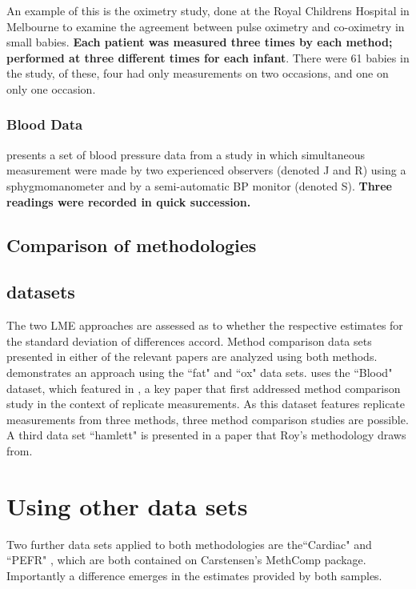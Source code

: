 \documentclass[12pt, a4paper]{report}
\theoremstyle{plain}
\theoremstyle{definition}
\theoremstyle{remark}
\begin{document}
An example of this is the oximetry study, done at the Royal
Childrens Hospital in Melbourne to examine the agreement between
pulse oximetry and co-oximetry in small babies.\textbf{ Each
patient was measured three times by each method; performed at
three different times for each infant}. There were 61 babies in
the study, of these, four had only measurements on two occasions,
and one on only one occasion.

\subsubsection{Blood Data}
\citet{BA99} presents a set of blood pressure data from a study in
which simultaneous measurement were made by two experienced
observers (denoted J and R) using a sphygmomanometer and by a
semi-automatic BP monitor (denoted S). \textbf{Three readings were
recorded in quick succession.}


\subsection{Comparison of methodologies}

\subsection{datasets}

The two LME approaches are assessed as to whether the respective estimates for the standard deviation of differences accord. Method comparison data sets presented in either of the relevant papers are analyzed using both methods.
\citet{bxc2008} demonstrates an approach using the ``fat" and ``ox" data sets. \citet{roy} uses the ``Blood" dataset, which featured in \citet{BA99} , a key paper that first addressed method comparison study in the context of replicate measurements. As this dataset features replicate measurements from three methods, three method comparison studies are possible. A third data set ``hamlett" is presented in \citet{Hamlett} a paper that Roy's methodology draws from.


\section{Using other data sets}

Two further data sets applied to both methodologies are the``Cardiac" and ``PEFR" , which are both contained on Carstensen's MethComp package.
Importantly a difference emerges in the estimates provided by both samples.
\end{document}
